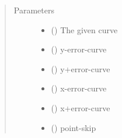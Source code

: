 \documentclass[letterpaper,10pt,english]{sphinxmanual}
\begin{document}
\begin{fulllineitems}
\begin{sphinxVerbatim}[commandchars=\\\{\}]
\PYG{p}{[}\PYG{p}{]} \PYG{p}{[}\PYG{p}{]} \PYG{p}{[}\PYG{p}{]}
\end{sphinxVerbatim}

\begin{sphinxVerbatim}[commandchars=\\\{\}]
 
\end{sphinxVerbatim}
\begin{quote}\begin{description}
\item[{Parameters}] \leavevmode\begin{itemize}
\item {} 
 ({\hyperref[\detokenize{pydv:curve.Curve}]{}}) \textendash{} The given curve

\item {} 
 ({\hyperref[\detokenize{pydv:curve.Curve}]{}}) \textendash{} y-error-curve

\item {} 
 ({\hyperref[\detokenize{pydv:curve.Curve}]{}}) \textendash{} y+error-curve

\item {} 
 ({\hyperref[\detokenize{pydv:curve.Curve}]{}}) \textendash{} x-error-curve

\item {} 
 ({\hyperref[\detokenize{pydv:curve.Curve}]{}}) \textendash{} x+error-curve

\item {} 
 () \textendash{} point-skip

\end{itemize}

\end{description}\end{quote}

\end{fulllineitems}
\end{document}
